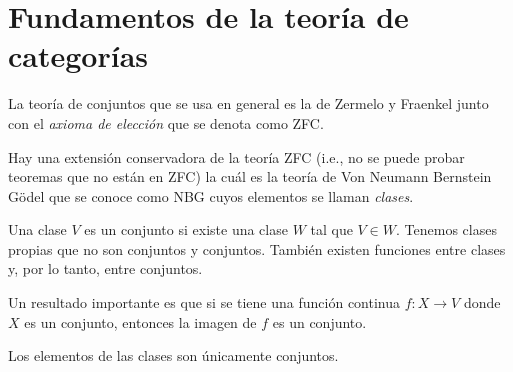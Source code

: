 \section{Fundamentos de la teoría de categorías}
\medskip
La teoría de conjuntos que se usa en general es la de Zermelo y Fraenkel junto con el \textit{axioma de elección} que se denota como ZFC. 

Hay una extensión conservadora de la teoría ZFC (i.e., no se puede probar teoremas que no están en ZFC) la cuál es la teoría de Von Neumann Bernstein Gödel que se conoce como NBG cuyos elementos se llaman \textit{clases}. 

Una clase $V$ es un conjunto si existe una clase $W$ tal que $V\in W$. Tenemos clases propias que no son conjuntos y conjuntos. También existen funciones entre clases y, por lo tanto, entre conjuntos.

Un resultado importante es que si se tiene una función continua $f:X\to V$ donde $X$ es un conjunto, entonces la imagen de $f$ es un conjunto.
\begin{nota}
    Los elementos de las clases son únicamente conjuntos. 
\end{nota}
